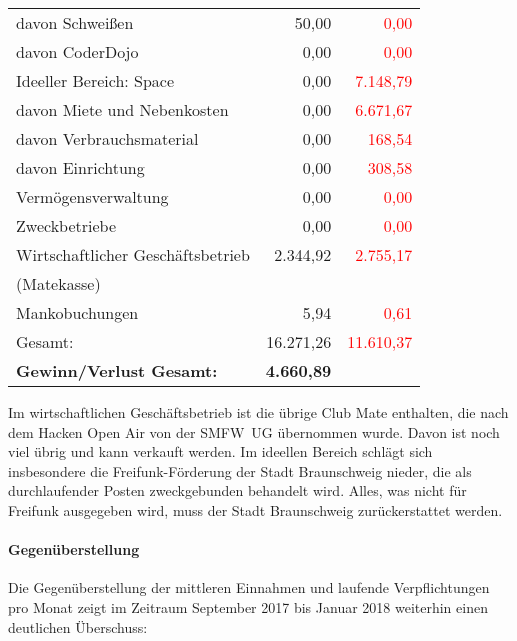 \documentclass{s0minutes}
\begin{document}
\begin{longtable}{lr>{\textcolor{red}\bgroup}r<{\egroup}}
  \quad davon Schweißen             &       50{,}00 &         0{,}00 \\
  \quad davon CoderDojo             &        0{,}00 &         0{,}00 \\
  \midrule
  Ideeller Bereich: Space           &        0{,}00 &   7{.}148{,}79 \\
  \quad davon Miete und Nebenkosten &        0{,}00 &   6{.}671{,}67 \\
  \quad davon Verbrauchsmaterial    &        0{,}00 &       168{,}54 \\
  \quad davon Einrichtung           &        0{,}00 &       308{,}58 \\
  \midrule
  Vermögensverwaltung               &        0{,}00 &         0{,}00 \\
  \midrule
  Zweckbetriebe                     &        0{,}00 &         0{,}00 \\
  \midrule
  Wirtschaftlicher Geschäftsbetrieb &  2{.}344{,}92 &   2{.}755{,}17 \\
  \quad (Matekasse) && \\
  \midrule
  Mankobuchungen                    &        5{,}94 &         0{,}61 \\
  \midrule\midrule
  Gesamt:                           & 16{.}271{,}26 &  11{.}610{,}37 \\

  \textbf{Gewinn/Verlust Gesamt:} & \textbf{4{.}660{,}89} &          \\
\end{longtable}

Im wirtschaftlichen Geschäftsbetrieb ist die übrige Club Mate enthalten, die
nach dem Hacken Open Air von der SMFW~UG übernommen wurde. Davon ist noch viel
übrig und kann verkauft werden. Im ideellen Bereich schlägt sich insbesondere
die Freifunk-Förderung der Stadt Braunschweig nieder, die als durchlaufender
Posten zweckgebunden behandelt wird. Alles, was nicht für Freifunk ausgegeben
wird, muss der Stadt Braunschweig zurückerstattet werden.

\paragraph{Gegenüberstellung}
Die Gegenüberstellung der mittleren Einnahmen und laufende Verpflichtungen pro
Monat zeigt im Zeitraum September 2017 bis Januar 2018 weiterhin einen
deutlichen Überschuss:
\end{document}
